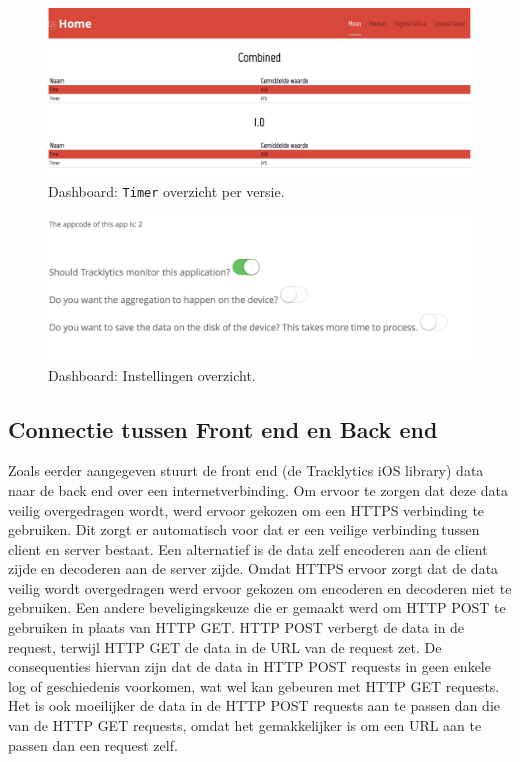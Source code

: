 \begin{figure}[!h]
  \centering
  \includegraphics[scale=0.2]{Afbeeldingen/Implementatie/Timer-Combined}
  \caption{Dashboard: \texttt{Timer} overzicht per versie.}
  \label{fig:DasbhoardTimerCombined}
\end{figure}

\begin{figure}[!h]
  \centering
  \includegraphics[scale=0.2]{Afbeeldingen/Implementatie/Settings}
  \caption{Dashboard: Instellingen overzicht.}
  \label{fig:DasbhoardSettings}
\end{figure}







\subsection{Connectie tussen Front end en Back end}
Zoals eerder aangegeven stuurt de front end (de Tracklytics iOS library) data naar de back end over een internetverbinding. Om ervoor te zorgen dat deze data veilig overgedragen wordt, werd ervoor gekozen om een HTTPS verbinding te gebruiken. Dit zorgt er automatisch voor dat er een veilige verbinding tussen client en server bestaat. Een alternatief is de data zelf encoderen aan de client zijde en decoderen aan de server zijde. Omdat HTTPS ervoor zorgt dat de data veilig wordt overgedragen werd ervoor gekozen om encoderen en decoderen niet te gebruiken.
Een andere beveligingskeuze die er gemaakt werd om HTTP POST te gebruiken in plaats van HTTP GET. HTTP POST verbergt de data in de request, terwijl HTTP GET de data in de URL van de request zet. De consequenties hiervan zijn dat de data in HTTP POST requests in geen enkele log of geschiedenis voorkomen, wat wel kan gebeuren met HTTP GET requests. Het is ook moeilijker de data in de HTTP POST requests aan te passen dan die van de HTTP GET requests, omdat het gemakkelijker is om een URL aan te passen dan een request zelf.\\

